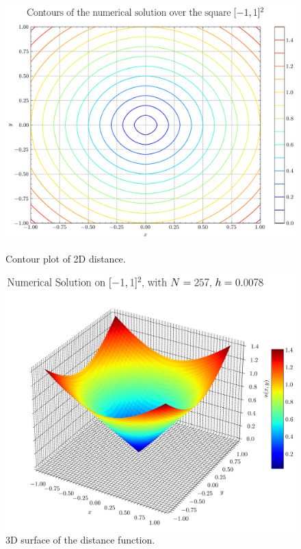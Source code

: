 \documentclass[11pt]{article}
\theoremstyle{definition}
\theoremstyle{remark}
\begin{document}
\begin{figure}[h!]
    \centering
    \begin{minipage}{0.48\linewidth}
        \centering
        \includegraphics[width=\linewidth]{plots/contour_plot_2D_distance.png}
        \caption{Contour plot of 2D distance.}
        \label{fig:contour-distance}
    \end{minipage}
    \hfill
    \begin{minipage}{0.48\linewidth}
        \centering
        \includegraphics[width=\linewidth]{plots/solution_3d_surface.png}
        \caption{3D surface of the distance function.}
        \label{fig:3d-surface}
    \end{minipage}
\end{figure}
\vspace{20pt}
\end{document}
